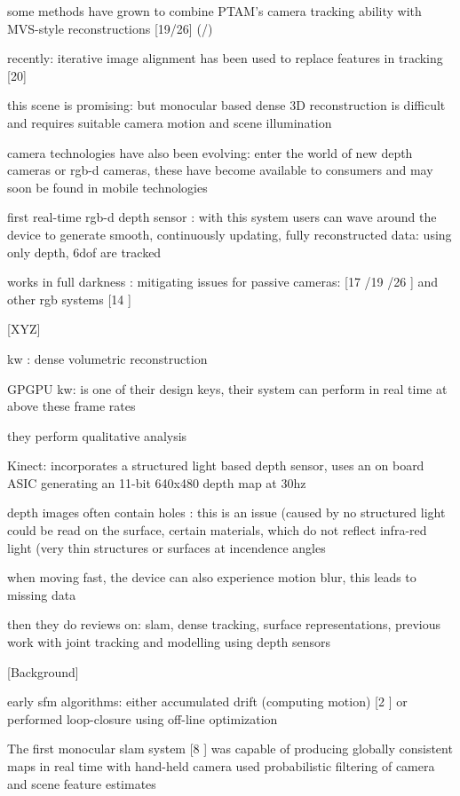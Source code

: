 some methods have grown to combine PTAM's camera tracking ability with MVS-style reconstructions [19/26] (\cite{Newcombe10Live}/\cite{Stuhmer10Real})

recently: iterative image alignment has been used to replace features in tracking [20] \cite{Newcombe11Dtam}

this scene is promising: but monocular based dense 3D reconstruction is difficult and requires suitable camera motion and scene illumination

camera technologies have also been evolving: enter the world of new depth cameras or rgb-d cameras,
these have become available to consumers and may soon be found in mobile technologies \cite{Zhang12Microsoft}

first real-time rgb-d depth sensor : with this system users can wave around the device to generate smooth, continuously updating, fully reconstructed data: using only depth, 6dof are tracked

works in full darkness : mitigating issues for passive cameras: [17 \cite{Klein07Parallel} /19 \cite{Newcombe10Live} /26 \cite{Stuhmer10Real}] and other rgb systems [14 \cite{Henry10Rgb}]

[XYZ]

kw : dense volumetric reconstruction

GPGPU kw: is one of their design keys, their system can perform in real time at above these frame rates

they perform qualitative analysis

Kinect: incorporates a structured light based depth sensor, uses an on board ASIC generating an 11-bit 640x480 depth map at 30hz

depth images often contain holes : this is an issue (caused by no structured light could be read on the surface, certain materials, which do not reflect infra-red light (very thin structures or surfaces at incendence angles

when moving fast, the device can also experience motion blur, this leads to missing data

then they do  reviews on:
	slam, dense tracking, surface representations, previous work with joint tracking and modelling using depth sensors

[Background]

early sfm algorithms: either accumulated drift (computing motion) [2 \cite{Beardsley97Sequential} ] or performed loop-closure using off-line optimization 

The first monocular slam system [8 \cite{Davison03Real} ] was capable of producing globally consistent maps in real time with hand-held camera used probabilistic filtering of camera and scene feature estimates

